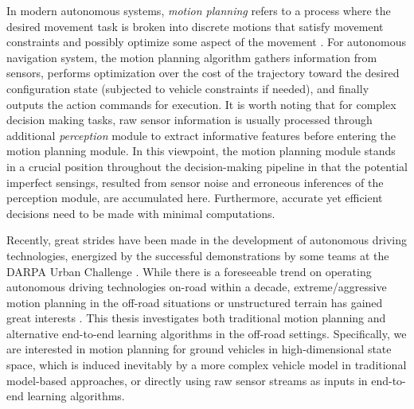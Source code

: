 \documentclass[../thesis.tex]{subfiles}
\begin{document}

In modern autonomous systems, \textit{motion planning} refers to a process where the desired movement task is broken into discrete motions that satisfy movement constraints and possibly optimize some aspect of the movement \cite{wiki:motion-planning}. 
For autonomous navigation system, the motion planning algorithm gathers information from sensors, performs optimization over the cost of the trajectory toward the desired configuration state (subjected to vehicle constraints if needed), and finally outputs the action commands for execution. 
It is worth noting that for complex decision making tasks, raw sensor information is usually processed through additional \textit{perception} module to extract informative features before entering the motion planning module.
In this viewpoint, the motion planning module stands in a crucial position throughout the decision-making pipeline in that the potential imperfect sensings, resulted from sensor noise and erroneous inferences of the perception module, are accumulated here. 
Furthermore, accurate yet efficient decisions need to be made with minimal computations.

Recently, great strides have been made in the development of autonomous driving technologies, energized by the successful demonstrations by some teams at the DARPA Urban Challenge \cite{boss, multimodaltartan}.
While there is a foreseeable trend on operating autonomous driving technologies on-road within a decade, extreme/aggressive motion planning in the off-road situations or unstructured terrain has gained great interests \cite{kolter2010probabilistic,williams2016aggressive,gray2012predictive,cutler2016autonomous,cutler2014reinforcement}. 
This thesis investigates both traditional motion planning and alternative end-to-end learning algorithms in the off-road settings.
Specifically, we are interested in motion planning for ground vehicles in high-dimensional state space, which is induced inevitably by a more complex vehicle model in traditional model-based approaches, or directly using raw sensor streams as inputs in end-to-end learning algorithms.
\end{document}
